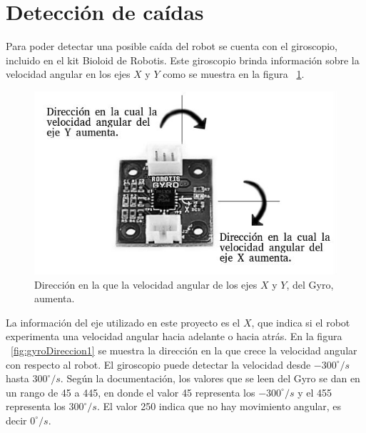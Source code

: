 \section{Detecci\'on de ca\'idas}

Para poder detectar una posible caída del robot se cuenta con el giroscopio, incluido en el kit Bioloid de Robotis. Este giroscopio brinda información sobre la velocidad angular en los ejes $X$ y $Y$ como se muestra en la figura ~\ref{fig:gyroDireccion}.

\begin{figure}[hbtp]
\centering
\includegraphics[scale=0.5]{imagenes/gyroDireccion.jpg}
\caption{Dirección en la que la velocidad angular de los ejes $X$ y $Y$, del Gyro, aumenta.}
\label{fig:gyroDireccion}
\end{figure}

La información del eje utilizado en este proyecto es el $X$, que indica si el robot experimenta una velocidad angular hacia adelante o hacia atrás. En la figura ~\ref{fig:gyroDireccion1} se muestra la direcci\'on en la que crece la velocidad angular con respecto al robot. El giroscopio puede detectar la velocidad desde $-300^{\circ}/s$ hasta $300^{\circ} /s$. Según la documentación, los valores que se leen del Gyro se dan en un rango de 45 a 445, en donde el valor 45 representa los $-300^{\circ}/s$ y el 455 representa los $300^{\circ} /s$. El valor 250 indica que no hay movimiento angular, es decir $0^{\circ}/s$. %

